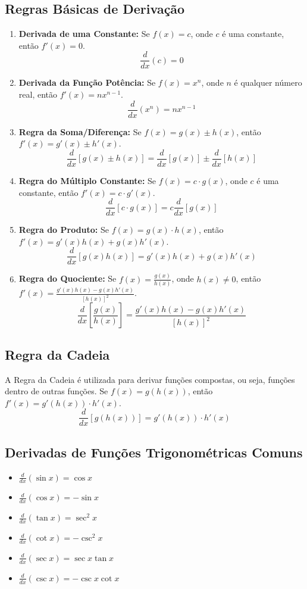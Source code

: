 \documentclass{article}
\begin{document}
\subsection{Regras Básicas de Derivação}
\begin{enumerate}
    \item \textbf{Derivada de uma Constante:}
    Se $f(x) = c$, onde $c$ é uma constante, então $f'(x) = 0$.
    $$ \frac{d}{dx}(c) = 0 $$

    \item \textbf{Derivada da Função Potência:}
    Se $f(x) = x^n$, onde $n$ é qualquer número real, então $f'(x) = nx^{n-1}$.
    $$ \frac{d}{dx}(x^n) = nx^{n-1} $$

    \item \textbf{Regra da Soma/Diferença:}
    Se $f(x) = g(x) \pm h(x)$, então $f'(x) = g'(x) \pm h'(x)$.
    $$ \frac{d}{dx}[g(x) \pm h(x)] = \frac{d}{dx}[g(x)] \pm \frac{d}{dx}[h(x)] $$

    \item \textbf{Regra do Múltiplo Constante:}
    Se $f(x) = c \cdot g(x)$, onde $c$ é uma constante, então $f'(x) = c \cdot g'(x)$.
    $$ \frac{d}{dx}[c \cdot g(x)] = c \frac{d}{dx}[g(x)] $$

    \item \textbf{Regra do Produto:}
    Se $f(x) = g(x) \cdot h(x)$, então $f'(x) = g'(x)h(x) + g(x)h'(x)$.
    $$ \frac{d}{dx}[g(x)h(x)] = g'(x)h(x) + g(x)h'(x) $$

    \item \textbf{Regra do Quociente:}
    Se $f(x) = \frac{g(x)}{h(x)}$, onde $h(x) \neq 0$, então $f'(x) = \frac{g'(x)h(x) - g(x)h'(x)}{[h(x)]^2}$.
    $$ \frac{d}{dx}\left[\frac{g(x)}{h(x)}\right] = \frac{g'(x)h(x) - g(x)h'(x)}{[h(x)]^2} $$
\end{enumerate}

\subsection{Regra da Cadeia}
A Regra da Cadeia é utilizada para derivar funções compostas, ou seja, funções dentro de outras funções.
Se $f(x) = g(h(x))$, então $f'(x) = g'(h(x)) \cdot h'(x)$.
$$ \frac{d}{dx}[g(h(x))] = g'(h(x)) \cdot h'(x) $$

\subsection{Derivadas de Funções Trigonométricas Comuns}
\begin{itemize}
    \item $ \frac{d}{dx}(\sin x) = \cos x $
    \item $ \frac{d}{dx}(\cos x) = -\sin x $
    \item $ \frac{d}{dx}(\tan x) = \sec^2 x $
    \item $ \frac{d}{dx}(\cot x) = -\csc^2 x $
    \item $ \frac{d}{dx}(\sec x) = \sec x \tan x $
    \item $ \frac{d}{dx}(\csc x) = -\csc x \cot x $
\end{itemize}
\end{document}
